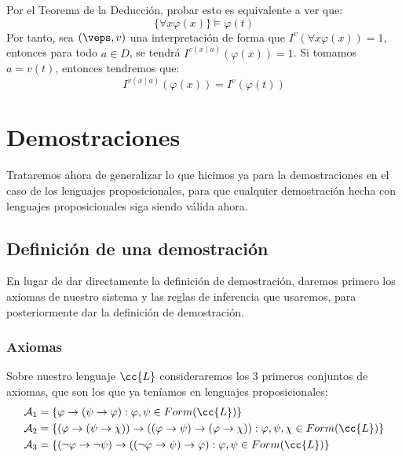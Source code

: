 \begin{ejemplo}
\begin{enumerate}
            Por el Teorema de la Deducción, probar esto es equivalente a ver que:
            \begin{equation*}
                \{\forall x\varphi(x)\}\vDash\varphi(t)
            \end{equation*}
        Por tanto, sea $(\veps, v)$ una interpretación de forma que $I^v(\forall x\varphi(x))=1$, entonces para todo $a\in D$, se tendrá $I^{v(x\mid a)}(\varphi(x)) = 1$. Si tomamos $a=v(t)$, entonces tendremos que:
        \begin{equation*}
            I^{v(x\mid a)}(\varphi(x)) = I^v(\varphi(t))
        \end{equation*}
    \end{enumerate}
\end{ejemplo}

\section{Demostraciones}
Trataremos ahora de generalizar lo que hicimos ya para la demostraciones en el caso de los lenguajes proposicionales, para que cualquier demostración hecha con lenguajes proposicionales siga siendo válida ahora.

\subsection{Definición de una demostración}
En lugar de dar directamente la definición de demostración, daremos primero los axiomas de nuestro sistema y las reglas de inferencia que usaremos, para posteriormente dar la definición de demostración.

\subsubsection{Axiomas}
\noindent
Sobre nuestro lenguaje $\cc{L}$ consideraremos los 3 primeros conjuntos de axiomas, que son los que ya teníamos en lenguajes proposicionales:
\begin{align*}
    \mathcal{A}_1 &= \{\varphi\to(\psi\to\varphi) : \varphi,\psi \in Form(\cc{L})\} \\
    \mathcal{A}_2 &= \{(\varphi\to(\psi\to\chi))\to((\varphi\to\psi)\to(\varphi\to\chi)) : \varphi,\psi,\chi \in Form(\cc{L})\} \\
    \mathcal{A}_3 &= \{(\lnot\varphi\to\lnot\psi)\to((\lnot\varphi\to\psi)\to\varphi) : \varphi,\psi \in Form(\cc{L})\}
\end{align*}

